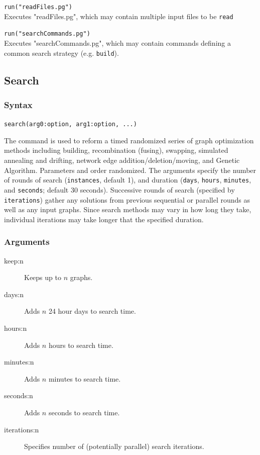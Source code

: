 	\begin{example}
		\item{\texttt{run("readFiles.pg")}\\ Executes "readFiles.pg", which may contain multiple input 
		files to be \texttt{read}}
		
		\item{\texttt{run("searchCommands.pg")}\\ Executes "searchCommands.pg", which may 
		contain commands defining a common search strategy (e.g. \texttt{build}).}
	\end{example}

\subsection{Search}
	\subsubsection{Syntax}
		\texttt{search(arg0:option, arg1:option, ...)}
	
	\begin{phygdescription}
		{The command is used to reform a timed randomized series of graph optimization methods 
		including building, recombination (fusing), swapping, simulated annealing and drifting, 
		network edge addition/deletion/moving, and Genetic Algorithm. Parameters and order
		randomized. The arguments specify the number of rounds of search (\texttt{instances}, 
		default 1), and duration (\texttt{days}, \texttt{hours}, \texttt{minutes}, and \texttt{seconds}; 
		default 30 seconds). Successive rounds of search (specified by \texttt{iterations}) gather 
		any solutions from previous sequential or parallel rounds as well as any input graphs.
		Since search methods may vary in how long they take, individual iterations may take 
		longer that the specified duration.}
	\end{phygdescription}
			
	\subsubsection{Arguments}
	\begin{description}
		\item[keep:n] Keeps up to $n$ graphs.
		
		\item[days:n] Adds $n$ 24 hour days to search time.
		
		\item[hours:n] Adds $n$ hours to search time.
		
		\item[minutes:n] Adds $n$ minutes to search time.
		
		\item[seconds:n] Adds $n$ seconds to search time.
		
		\item[iterations:n] Specifies number of (potentially parallel) search iterations.
	\end{description}
		

